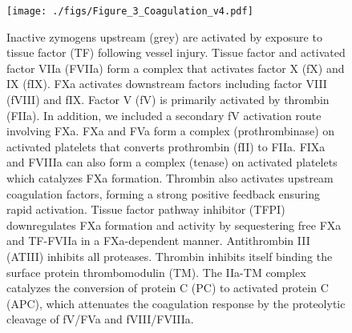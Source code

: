 \documentclass{bmcart}
\begin{document}
\begin{backmatter}
\begin{figure}[h!]
\centering
\texttt{[image: ./figs/Figure\_3\_Coagulation\_v4.pdf]}
\caption{ Inactive zymogens upstream (grey) are activated by exposure to tissue factor (TF)  following vessel injury. Tissue factor and activated factor VIIa (FVIIa) form a complex that activates factor X (fX) and IX (fIX). FXa activates downstream factors including factor VIII (fVIII) and fIX. Factor V (fV) is primarily activated by thrombin (FIIa). In addition, we included a secondary fV activation route involving FXa. FXa and FVa form a complex (prothrombinase) on activated platelets that converts prothrombin (fII) to FIIa. FIXa and FVIIIa can also form a complex (tenase) on activated platelets which catalyzes FXa formation.  Thrombin also activates upstream coagulation factors, forming a strong positive feedback ensuring rapid activation. Tissue factor pathway inhibitor (TFPI) downregulates FXa formation and activity by sequestering free FXa and TF-FVIIa in a FXa-dependent manner. Antithrombin III (ATIII)  inhibits all proteases. Thrombin inhibits itself binding the surface protein thrombomodulin (TM). The IIa-TM complex catalyzes the conversion of protein C (PC) to activated protein C (APC), which attenuates the coagulation response by the proteolytic cleavage of fV/FVa and fVIII/FVIIIa. }\label{fig-coagulation-network}
\end{figure}

\clearpage


\end{backmatter}
\end{document}
